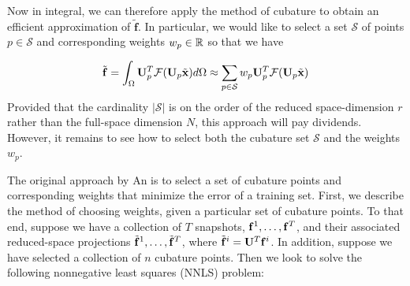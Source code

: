 Now in integral, we can therefore apply the method of cubature \cite{Press:1992:NumRecipes} to obtain an efficient approximation of $\tilde{\mathbf{f}}$. In particular, we would like to select a set
$\mathcal{S}$ of points $p \in \mathcal{S}$ and corresponding weights $w_p \in \mathbb{R}$ so that we have

\begin{equation}
\label{eq:integral}
\tilde{\mathbf{f}} = \int_{\Omega} \mathbf{U}_p^T \mathcal{F}(\mathbf{U}_p \tilde{\mathbf{x}})d\Omega \approx \sum_{p \in \mathcal{S}} w_p \mathbf{U}_p^T \mathcal{F}(\mathbf{U}_p \tilde{\mathbf{x}})
\end{equation}
Provided that the cardinality $|\mathcal{S}|$ is on the order of the reduced space-dimension $r$ rather than the full-space dimension $N$, this approach will pay dividends. However, it remains to see
how to select both the cubature set $\mathcal{S}$ and the weights $w_p$. 

The original approach by An is to select a set of cubature points and corresponding weights that minimize the error of a training set. First, we describe the method of choosing weights,
given a particular set of cubature points. To that end, suppose we have a collection of $T$ snapshots, $\mathbf{f}^1, \dots, \mathbf{f}^T$, and
their associated reduced-space projections $\tilde{\mathbf{f}}^1, \dots, \tilde{\mathbf{f}}^T$, where $\tilde{\mathbf{f}}^i = \mathbf{U}^T\mathbf{f}^i$. In addition, suppose we have selected a collection of $n$ cubature points. Then we look to solve the
following nonnegative least squares (NNLS) problem:


